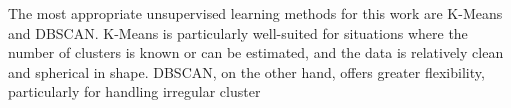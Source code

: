The most appropriate unsupervised learning methods for this work are K-Means and DBSCAN. K-Means is particularly well-suited for situations where the number of clusters is known or can be estimated, and the data is relatively clean and spherical in shape. DBSCAN, on the other hand, offers greater flexibility, particularly for handling irregular cluster
